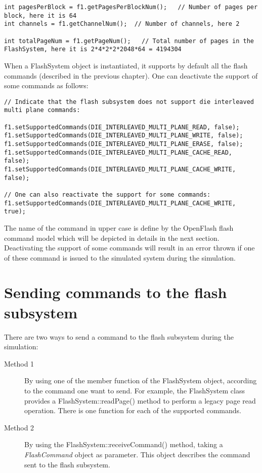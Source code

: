 \begin{lstlisting}
int pagesPerBlock = f1.getPagesPerBlockNum();   // Number of pages per block, here it is 64
int channels = f1.getChannelNum();  // Number of channels, here 2

int totalPageNum = f1.getPageNum();   // Total number of pages in the FlashSystem, here it is 2*4*2*2*2048*64 = 4194304
\end{lstlisting}

When a FlashSystem object is instantiated, it supports by default all the flash commands (described in the previous chapter). One can deactivate the support of some commands as follows:

\begin{lstlisting}
// Indicate that the flash subsystem does not support die interleaved multi plane commands:

f1.setSupportedCommands(DIE_INTERLEAVED_MULTI_PLANE_READ, false);
f1.setSupportedCommands(DIE_INTERLEAVED_MULTI_PLANE_WRITE, false);
f1.setSupportedCommands(DIE_INTERLEAVED_MULTI_PLANE_ERASE, false);
f1.setSupportedCommands(DIE_INTERLEAVED_MULTI_PLANE_CACHE_READ, false);
f1.setSupportedCommands(DIE_INTERLEAVED_MULTI_PLANE_CACHE_WRITE, false);

// One can also reactivate the support for some commands:
f1.setSupportedCommands(DIE_INTERLEAVED_MULTI_PLANE_CACHE_WRITE, true);
\end{lstlisting}

The name of the command in upper case is define by the OpenFlash flash command model which will be depicted in details in the next section. Deactivating the support of some commands will result in an error thrown if one of these command is issued to the simulated system during the simulation.

\section{Sending commands to the flash subsystem}
There are two ways to send a command to the flash subsystem during the simulation:

\begin{description}
  \item[Method 1] By using one of the member function of the FlashSystem object, according to the command one want to send. For example, the FlashSystem class provides a FlashSystem::readPage() method to perform a legacy page read operation. There is one function for each of the supported commands.
  \item[Method 2] By using the FlashSystem::receiveCommand() method, taking a \emph{FlashCommand} object as parameter. This object describes the command sent to the flash subsystem.
\end{description}

